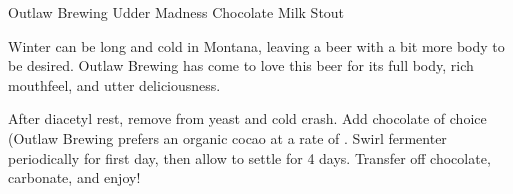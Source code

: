 \begin{recipie}{Outlaw Brewing Udder Madness Chocolate Milk Stout}

\begin{aboutblock}
Winter can be long and cold in Montana, leaving a beer with a bit more body to be
desired. Outlaw Brewing has come to love this beer for its full body, rich
mouthfeel, and utter deliciousness. \sourceaha
\end{aboutblock}


\begin{methodandtiming}
 
\begin{mashsteps}
\end{mashsteps}

\begin{fermentationsteps}
\end{fermentationsteps}

\begin{directions}
After diacetyl rest, remove from yeast and cold crash. Add chocolate of
choice (Outlaw Brewing prefers an organic cocao at a rate of .
Swirl fermenter periodically for first day, then allow to settle for 4 days.
Transfer off chocolate, carbonate, and enjoy!
\end{directions}

\end{methodandtiming}

\pagebreak

\begin{ingredientsblock}
 
\begin{malts}
\end{malts}

\begin{hops}
\end{hops}


\begin{twists}
\end{twists}

\end{ingredientsblock}

\end{recipie}

